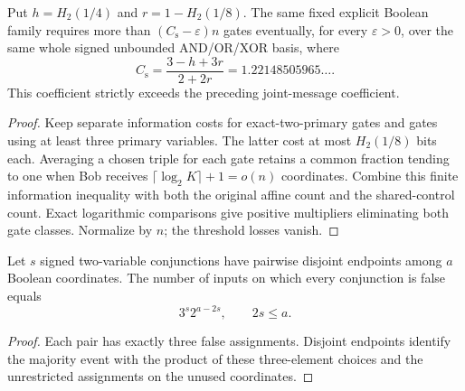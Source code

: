 \begin{theorem}
  \label{thm:lowerbounds-algebraic-geometry-shared-explicit}
  \leanok
  Put $h=H_2(1/4)$ and $r=1-H_2(1/8)$. The same fixed explicit Boolean family
  requires more than $(C_{\mathrm s}-\varepsilon)n$ gates eventually, for every
  $\varepsilon>0$, over the same whole signed unbounded AND/OR/XOR basis, where
  \[
    C_{\mathrm s}=\frac{3-h+3r}{2+2r}=1.22148505965\ldots.
  \]
  This coefficient strictly exceeds the preceding joint-message coefficient.
\end{theorem}
\begin{proof}
  \leanok
  Keep separate information costs for exact-two-primary gates and gates using at
  least three primary variables. The latter cost at most $H_2(1/8)$ bits each.
  Averaging a chosen triple for each gate retains a common fraction tending to one
  when Bob receives $\lceil\log_2K\rceil+1=o(n)$ coordinates. Combine this finite
  information inequality with both the original affine count and the shared-control
  count. Exact logarithmic comparisons give positive multipliers eliminating both
  gate classes. Normalize by $n$; the threshold losses vanish.
\end{proof}

\begin{lemma}
  \label{lem:lowerbounds-algebraic-geometry-majority-count}
  \leanok
  Let $s$ signed two-variable conjunctions have pairwise disjoint endpoints
  among $a$ Boolean coordinates. The number of inputs on which every conjunction
  is false equals
  \[
    3^s2^{a-2s},\qquad 2s\le a.
  \]
\end{lemma}
\begin{proof}
  \leanok
  Each pair has exactly three false assignments. Disjoint endpoints identify
  the majority event with the product of these three-element choices and the
  unrestricted assignments on the unused coordinates.
\end{proof}

